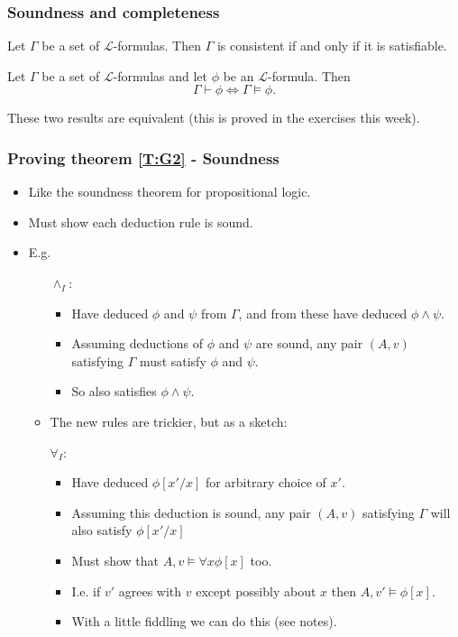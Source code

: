\documentclass[handout]{beamer}
\newcommand{\sL}{\mathscr{L}}
\begin{document}
\begin{frame}
\frametitle{Soundness and completeness}
\begin{theorem}[G\"odel]\label{T:G1}
Let $\Gamma$ be a set of $\sL$-formulas. Then $\Gamma$ is consistent if and only if it is satisfiable.
\end{theorem}\vspace{0.5cm}
\begin{theorem}\label{T:G2}
Let $\Gamma$ be a set of $\sL$-formulas and let $\phi$ be an $\sL$-formula. Then
\[\Gamma\vdash \phi\iff \Gamma\models \phi.\]
\end{theorem}\vspace{0.5cm}
These two results are equivalent (this is proved in the exercises this week).
\end{frame}

\begin{frame}
\frametitle{Proving theorem \ref{T:G2} - Soundness}
\begin{itemize}
\item Like the soundness theorem for propositional logic.
\item Must show each deduction rule is sound.
\item E.g. 
\begin{itemize}
\item[$\wedge_I$:] 
\begin{itemize} 
\item Have deduced $\phi$ and $\psi$ from $\Gamma$, and from these have deduced $\phi\wedge \psi$. 
\item Assuming deductions of $\phi$ and $\psi$ are  sound, any pair $(A,v)$ satisfying $\Gamma$ must satisfy $\phi$ and $\psi$. 
\item So also satisfies $\phi\wedge \psi$.
\end{itemize}
\end{itemize}
\begin{itemize}
\item The new rules are trickier, but as a sketch:
\item[$\forall_I$:] 
\begin{itemize}
\item Have deduced $\phi[x'/x]$ for arbitrary choice of $x'$. 
\item Assuming this deduction is sound, any pair $(A,v)$ satisfying $\Gamma$ will also satisfy $\phi[x'/x]$ 
\item Must show that $A,v\models \forall x \phi[x]$ too.
\item I.e. if $v'$ agrees with $v$ except possibly about $x$ then $A,v'\models \phi[x]$.
\item With a little fiddling we can do this (see notes).
\end{itemize}
\end{itemize}
\end{itemize}
\end{frame}
\end{document}
